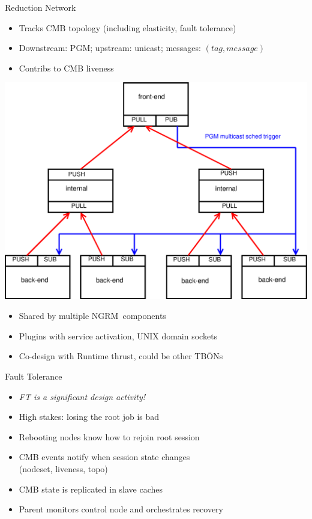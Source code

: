 \documentclass[default,pdf,colorBG,slideColor]{prosper}
\newcommand{\ngrm}{NGRM}
\begin{document}
\begin{slide}{Reduction Network}{\small
\begin{minipage}{0.50\textwidth}
\begin{itemize}
  \item{Tracks CMB topology (including elasticity, fault tolerance)}
  \item{Downstream: PGM; upstream: unicast; messages: $(tag, message)$}
  \item{Contribs to CMB liveness}
\end{itemize}
\vspace{0.10mm}
\end{minipage}
\begin{minipage}{0.40\textwidth}
\begin{center}
\includegraphics[scale=0.20]{comms_zmq_reduct}
\end{center}
\end{minipage}
\begin{itemize}
  \item{Shared by multiple \ngrm\ components}
  \item{Plugins with service activation, UNIX domain sockets}
  \item{Co-design with Runtime thrust, could be other TB\={O}Ns}
\end{itemize}
}\end{slide}
\begin{slide}{Fault Tolerance}{\small
\begin{itemize}
  \item{{\em FT is a significant design activity!}}
  \item{High stakes: losing the root job is bad}
  \item{Rebooting nodes know how to rejoin root session}
  \item{CMB events notify when session state changes\\
	(nodeset, liveness, topo)}
  \item{CMB state is replicated in slave caches}
  \item{Parent monitors control node and orchestrates recovery}
\end{itemize}
}\end{slide}
\end{document}
